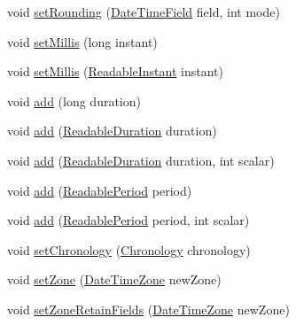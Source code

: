 \begin{DoxyCompactItemize}
\item 
void \hyperlink{classorg_1_1joda_1_1time_1_1_mutable_date_time_ae662772db7d99a86e3022fe8729b93a5}{set\-Rounding} (\hyperlink{classorg_1_1joda_1_1time_1_1_date_time_field}{Date\-Time\-Field} field, int mode)
\item 
void \hyperlink{classorg_1_1joda_1_1time_1_1_mutable_date_time_aedfc4d80869624f55bc554004c6ea63c}{set\-Millis} (long instant)
\item 
void \hyperlink{classorg_1_1joda_1_1time_1_1_mutable_date_time_a627e8ce806cb8a028c98ee9ec6e5e6c5}{set\-Millis} (\hyperlink{interfaceorg_1_1joda_1_1time_1_1_readable_instant}{Readable\-Instant} instant)
\item 
void \hyperlink{classorg_1_1joda_1_1time_1_1_mutable_date_time_a4d0dc6186b0a0861c6f6e006d0c23b0d}{add} (long duration)
\item 
void \hyperlink{classorg_1_1joda_1_1time_1_1_mutable_date_time_ad0245e7644fd54c2b627189df6e334bb}{add} (\hyperlink{interfaceorg_1_1joda_1_1time_1_1_readable_duration}{Readable\-Duration} duration)
\item 
void \hyperlink{classorg_1_1joda_1_1time_1_1_mutable_date_time_aff95af1570f4b262d5c979fe99333315}{add} (\hyperlink{interfaceorg_1_1joda_1_1time_1_1_readable_duration}{Readable\-Duration} duration, int scalar)
\item 
void \hyperlink{classorg_1_1joda_1_1time_1_1_mutable_date_time_ad99b36f01e675d81a92cc08427d4bd81}{add} (\hyperlink{interfaceorg_1_1joda_1_1time_1_1_readable_period}{Readable\-Period} period)
\item 
void \hyperlink{classorg_1_1joda_1_1time_1_1_mutable_date_time_ade761e4900dfb977242ea4221c9adf8f}{add} (\hyperlink{interfaceorg_1_1joda_1_1time_1_1_readable_period}{Readable\-Period} period, int scalar)
\item 
void \hyperlink{classorg_1_1joda_1_1time_1_1_mutable_date_time_a66f6c06865c61fc86becef17bfe2b940}{set\-Chronology} (\hyperlink{classorg_1_1joda_1_1time_1_1_chronology}{Chronology} chronology)
\item 
void \hyperlink{classorg_1_1joda_1_1time_1_1_mutable_date_time_ab03b58a7e43682f4860f2dec51d30fe9}{set\-Zone} (\hyperlink{classorg_1_1joda_1_1time_1_1_date_time_zone}{Date\-Time\-Zone} new\-Zone)
\item 
void \hyperlink{classorg_1_1joda_1_1time_1_1_mutable_date_time_aefcb4cd4480695acef00d3ab96d009d3}{set\-Zone\-Retain\-Fields} (\hyperlink{classorg_1_1joda_1_1time_1_1_date_time_zone}{Date\-Time\-Zone} new\-Zone)
\item 

\end{DoxyCompactItemize}
